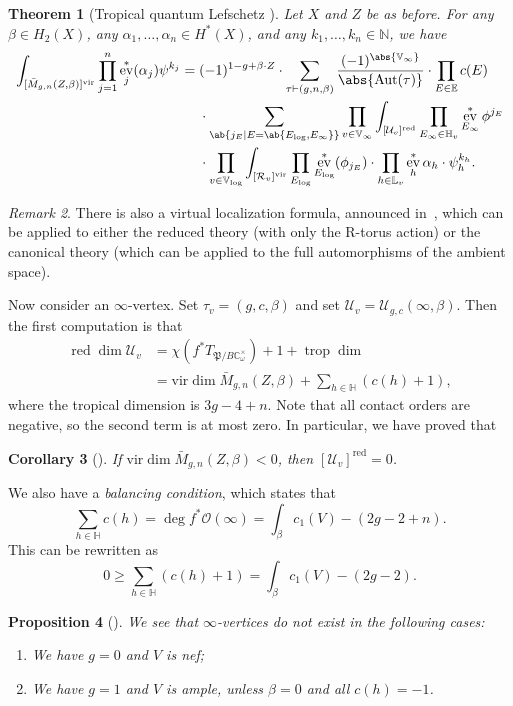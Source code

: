 \documentclass{amsart}
\newtheorem{thm}{Theorem}[section]
\newtheorem{cor}[thm]{Corollary}
\newtheorem{prop}[thm]{Proposition}
\theoremstyle{definition}
\theoremstyle{remark}
\newtheorem{rmk}[thm]{Remark}
\theoremstyle{plain}
\theoremstyle{definition}
\theoremstyle{remark}
\newcommand{\N}{\mathbb{N}}
\newcommand{\C}{\mathbb{C}}
\newcommand{\E}{\mathbb{E}}
\newcommand{\V}{\mathbb{V}}
\renewcommand{\H}{\mathbb{H}}
\renewcommand{\L}{\mathbb{L}}
\newcommand{\mc}[1]{\mathcal{#1}}
\newcommand{\mf}[1]{\mathfrak{#1}}
\newcommand{\mr}[1]{\mathrm{#1}}
\newcommand{\on}[1]{\operatorname{#1}}
\newcommand{\1}{\mathbf{1}}
\newcommand{\2}{\mathbf{2}}
\newcommand{\3}{\mathbf{3}}
\newcommand{\vir}{\mr{vir}}
\DeclareMathOperator{\Aut}{Aut}
\DeclareMathOperator{\ev}{ev}
\begin{document}
\begin{thm}[Tropical quantum Lefschetz {\cite{CJRtropical2025}}]
    Let \(X\) and \(Z\) be as before. For any \(\beta \in H_2(X)\), any \(\alpha_1, \ldots, \alpha_n \in H^*(X)\), and any \(k_1, \ldots, k_n \in \N\), we have
    \begin{align*}
        \int_{[\bar{M}_{g,n}(Z,\beta)]^{\vir}} \prod_{j=1}^n \ev_j^* (\alpha_j) \psi^{k_j}={}& (-1)^{1-g+\beta \cdot Z} \cdot \sum_{\tau \vdash (g,n,\beta)} \frac{(-1)^{\abs{\V_{\infty}}}}{\abs{\Aut(\tau)}} \cdot \prod_{E \in \E} c(E) \\
        & \cdot \sum_{\ab\{j_E \mid E = \ab\{E_{\log}, E_{\infty}\}\}}  \prod_{v \in \V_{\infty}} \int_{[\mc{U}_v]^{\on{red}}} \prod_{E_{\infty} \in \H_v} \ev_{E_{\infty}}^* \phi^{j_E}  \\
        &  \cdot \prod_{v \in \V_{\log}} \int_{[\mc{R}_v]^{\vir}} \prod_{E_{\log}} \ev_{E_{\log}}^* (\phi_{j_E}) \cdot \prod_{h \in \L_v} \ev_h^* \alpha_h \cdot \psi_h^{k_h} .
    \end{align*}
\end{thm}

\begin{rmk}
    There is also a virtual localization formula, announced in~\cite{CJRlocalization}, which can be applied to either the reduced theory (with only the R-torus action) or the canonical theory (which can be applied to the full automorphisms of the ambient space).
\end{rmk}

Now consider an \(\infty\)-vertex. Set \(\tau_v = (g, c, \beta)\) and set \(\mc{U}_v = \mc{U}_{g,c}(\infty, \beta)\). Then the first computation is that
\begin{align*}
    \on{red}\dim \mc{U}_v &= \chi(f^* T_{\mf{P}/B \C^{\times}_{\omega}}) + 1 + \on{trop}\dim  \\
    &= \vir\dim \bar{M}_{g,n}(Z, \beta) + \sum_{h \in \H } (c(h) + 1),
\end{align*}
where the tropical dimension is \(3g-4+n\). Note that all contact orders are negative, so the second term is at most zero. In particular, we have proved that
\begin{cor}[{\cite{CJRpunctured}}]
    If \(\vir\dim \bar{M}_{g,n}(Z,\beta) < 0\), then \([\mc{U}_v]^{\on{red}} = 0\).
\end{cor}
We also have a \textit{balancing condition}, which states that 
\begin{equation}\label{eqn:balancing condition}
    \sum_{h \in \H} c(h) = \deg f^* \mc{O}(\infty) = \int_{\beta} c_1(V) - (2g-2+n).
\end{equation}
This can be rewritten as
\[ 0 \geq \sum_{h \in \H} (c(h)+1) = \int_{\beta} c_1(V) - (2g-2). \]
\begin{prop}[{\cite{CJRpunctured}}]
    We see that \(\infty\)-vertices do not exist in the following cases:
    \begin{enumerate}
        \item We have \(g = 0\) and \(V\) is nef;
        \item We have \(g=1\) and \(V\) is ample, unless \(\beta = 0\) and all \(c(h) = -1\).
    \end{enumerate}
\end{prop}
\end{document}

